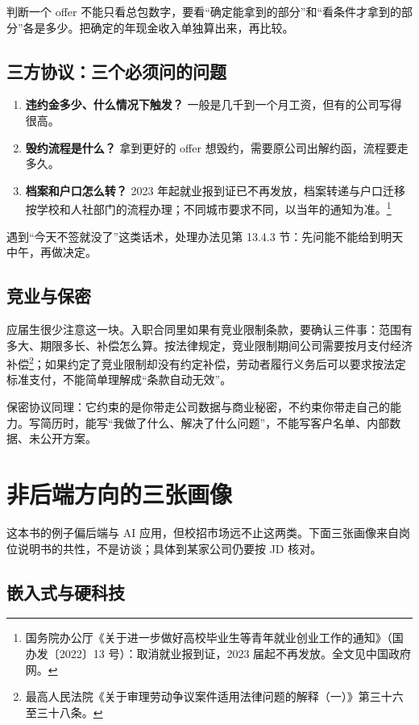 \documentclass[UTF8,zihao=5,openany]{ctexbook}
\begin{document}
判断一个 offer 不能只看总包数字，要看“确定能拿到的部分”和“看条件才拿到的部分”各是多少。把确定的年现金收入单独算出来，再比较。

\subsection{三方协议：三个必须问的问题}
\begin{enumerate}
\item \textbf{违约金多少、什么情况下触发？} 一般是几千到一个月工资，但有的公司写得很高。
\item \textbf{毁约流程是什么？} 拿到更好的 offer 想毁约，需要原公司出解约函，流程要走多久。
\item \textbf{档案和户口怎么转？} 2023 年起就业报到证已不再发放，档案转递与户口迁移按学校和人社部门的流程办理；不同城市要求不同，以当年的通知为准。\footnote{国务院办公厅《关于进一步做好高校毕业生等青年就业创业工作的通知》（国办发〔2022〕13 号）：取消就业报到证，2023 届起不再发放。全文见中国政府网。}
\end{enumerate}

遇到“今天不签就没了”这类话术，处理办法见第 13.4.3 节：先问能不能给到明天中午，再做决定。

\subsection{竞业与保密}
应届生很少注意这一块。入职合同里如果有竞业限制条款，要确认三件事：范围有多大、期限多长、补偿怎么算。按法律规定，竞业限制期间公司需要按月支付经济补偿\footnote{最高人民法院《关于审理劳动争议案件适用法律问题的解释（一）》第三十六至三十八条。}；如果约定了竞业限制却没有约定补偿，劳动者履行义务后可以要求按法定标准支付，不能简单理解成“条款自动无效”。

保密协议同理：它约束的是你带走公司数据与商业秘密，不约束你带走自己的能力。写简历时，能写“我做了什么、解决了什么问题”，不能写客户名单、内部数据、未公开方案。


\section{非后端方向的三张画像}

这本书的例子偏后端与 AI 应用，但校招市场远不止这两类。下面三张画像来自岗位说明书的共性，不是访谈；具体到某家公司仍要按 JD 核对。

\subsection{嵌入式与硬科技}
\end{document}
